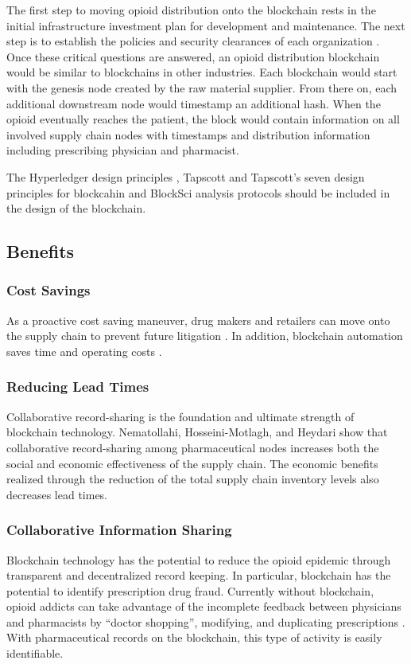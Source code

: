 \documentclass[sigconf]{acmart}
\begin{document}
The first step to moving opioid distribution onto the blockchain rests in the initial infrastructure investment plan for development and maintenance. The next step is to establish the policies and security clearances of each organization \cite{Christidis01}. Once these critical questions are answered, an opioid distribution blockchain would be similar to blockchains in other industries. Each blockchain would start with the genesis node created by the raw material supplier. From there on, each additional downstream node would timestamp an additional hash. When the opioid eventually reaches the patient, the block would contain information on all involved supply chain nodes with timestamps and distribution information including prescribing physician and pharmacist. 

The Hyperledger design principles \cite{Cocco01} \cite{Hyperledger01}, Tapscott and Tapscott's seven design principles for blockcahin \cite{tapscott} and BlockSci \cite{Kalodner01} analysis protocols should be included in the design of the blockchain.

\subsection{Benefits}
\subsubsection{Cost Savings} As a proactive cost saving maneuver, drug makers and retailers can move onto the supply chain to prevent future litigation \cite{Noguchi01}. In addition, blockchain automation saves time and operating costs \cite{Hyperledger01}.  
\subsubsection{Reducing Lead Times} Collaborative record-sharing is the foundation and ultimate strength of blockchain technology. Nematollahi, Hosseini-Motlagh, and Heydari \cite{Nematollahi01} show that collaborative record-sharing among pharmaceutical nodes increases both the social and economic effectiveness of the supply chain. The economic benefits realized through the reduction of the total supply chain inventory levels also decreases lead times. 
\subsubsection{Collaborative Information Sharing} Blockchain technology has the potential to reduce the opioid epidemic through transparent and decentralized record keeping. In particular, blockchain has the potential to identify prescription drug fraud. Currently without blockchain, opioid addicts can take advantage of the incomplete feedback between physicians and pharmacists by ``doctor shopping'', modifying, and duplicating prescriptions \cite{hitchingHealthcare}. With pharmaceutical records on the blockchain, this type of activity is easily identifiable. 
\end{document}
